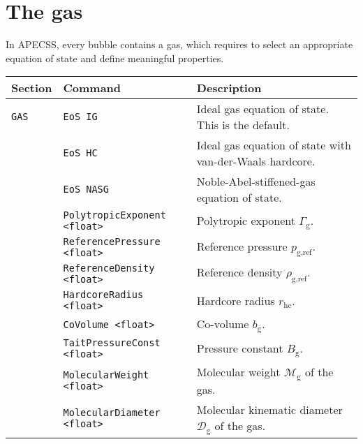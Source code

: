 \section{The gas}
\label{sec:gas}

In APECSS, every bubble contains a gas, which requires to select an appropriate equation of state and define meaningful properties.

\vspace{0.8em}

\noindent
\begin{tabular}{p{} p{} p{}}
    \textbf{Section} &\textbf{Command} & \textbf{Description} 
\vspace{1mm} \\ \hline
{\tt GAS} & {\tt EoS IG} & Ideal gas equation of state. This is the default.\\ 
& {\tt EoS HC} & Ideal gas equation of state with van-der-Waals hardcore.\\ 
& {\tt EoS NASG} & Noble-Abel-stiffened-gas equation of state.\\
& {\tt PolytropicExponent <float>} & Polytropic exponent $\Gamma_\text{g}$.\\
& {\tt ReferencePressure <float>} & Reference pressure $p_\text{g,ref}$.\\
& {\tt ReferenceDensity <float>} & Reference density $\rho_\text{g,ref}$.\\
& {\tt HardcoreRadius <float>} & Hardcore radius $r_\text{hc}$.\\
& {\tt CoVolume <float>} & Co-volume $b_\text{g}$.\\
& {\tt TaitPressureConst <float>} & Pressure constant $B_\text{g}$.\\
& {\tt MolecularWeight <float>} & Molecular weight $\mathcal{M}_{\text{g}}$ of the gas. \\
& {\tt MolecularDiameter <float>} & Molecular kinematic diameter $\mathcal{D}_{\text{g}}$ of the gas. \\
 \hline
\end{tabular} \vspace{1em}


